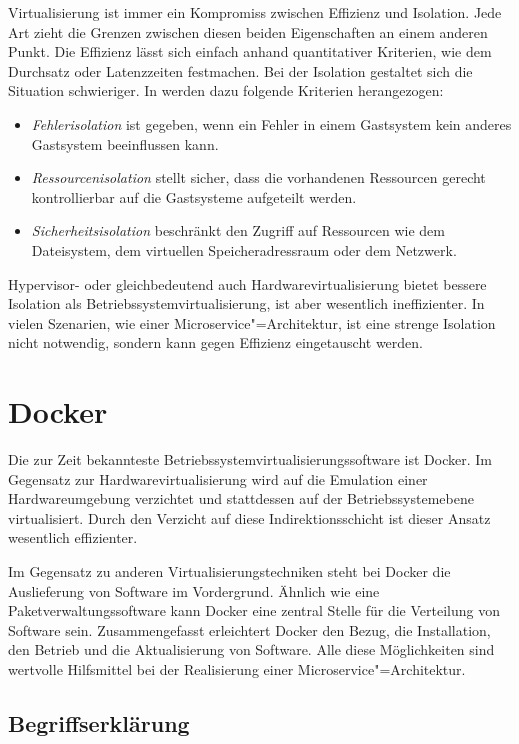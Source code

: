 Virtualisierung ist immer ein Kompromiss zwischen Effizienz und Isolation. Jede Art zieht die Grenzen zwischen diesen beiden Eigenschaften an einem anderen Punkt. Die Effizienz lässt sich einfach anhand quantitativer Kriterien, wie dem Durchsatz oder Latenzzeiten festmachen. Bei der Isolation gestaltet sich die Situation schwieriger. In \cite{Soltesz:2007:COS:1272996.1273025} werden dazu folgende Kriterien herangezogen:

\begin{itemize}
	\item \textit{Fehlerisolation} ist gegeben, wenn ein Fehler in einem Gastsystem kein anderes Gastsystem beeinflussen kann.
	\item \textit{Ressourcenisolation} stellt sicher, dass die vorhandenen Ressourcen gerecht \bzw kontrollierbar auf die Gastsysteme aufgeteilt werden.
	\item \textit{Sicherheitsisolation} beschränkt den Zugriff auf Ressourcen wie dem Dateisystem, dem virtuellen Speicheradressraum oder dem Netzwerk.
\end{itemize}

Hypervisor- oder gleichbedeutend auch Hardwarevirtualisierung bietet bessere Isolation als Betriebssystemvirtualisierung, ist aber wesentlich ineffizienter. In vielen Szenarien, wie einer Microservice"=Architektur, ist eine strenge Isolation nicht notwendig, sondern kann gegen Effizienz eingetauscht werden.

\section{Docker}

Die zur Zeit bekannteste Betriebssystemvirtualisierungssoftware ist Docker. Im Gegensatz zur Hardwarevirtualisierung wird auf die Emulation einer Hardwareumgebung verzichtet und stattdessen auf der Betriebssystemebene virtualisiert. Durch den Verzicht auf diese Indirektionsschicht ist dieser Ansatz wesentlich effizienter.

Im Gegensatz zu anderen Virtualisierungstechniken steht bei \mbox{Docker} die Auslieferung von Software im Vordergrund. Ähnlich wie eine Paketverwaltungssoftware kann Docker eine zentral Stelle für die Verteilung von Software sein. Zusammengefasst erleichtert Docker den Bezug, die Installation, den Betrieb und die Aktualisierung von Software. Alle diese Möglichkeiten sind wertvolle Hilfsmittel bei der Realisierung einer Microservice"=Architektur.

\subsection{Begriffserklärung}


